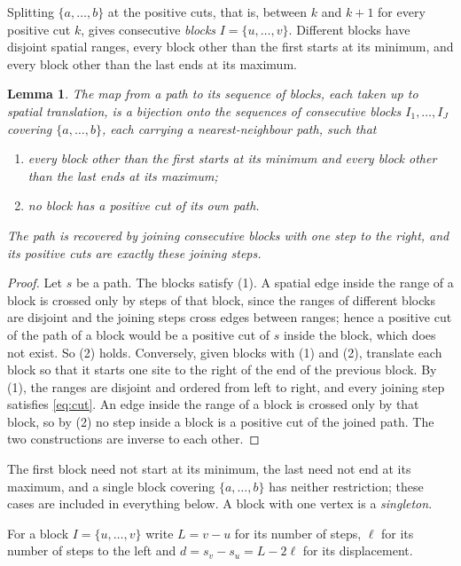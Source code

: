 \documentclass[11pt]{amsart}
\newtheorem{lemma}[theorem]{Lemma}
\theoremstyle{remark}
\begin{document}
Splitting $\{a,\dots,b\}$ at the positive cuts, that is, between $k$ and $k+1$ for every positive cut $k$, gives
consecutive \emph{blocks} $I=\{u,\dots,v\}$. Different blocks have disjoint spatial ranges, every block other than the
first starts at its minimum, and every block other than the last ends at its maximum.

\begin{lemma}\label{lem:blocks}
The map from a path to its sequence of blocks, each taken up to spatial translation, is a bijection onto the sequences
of consecutive blocks $I_1,\dots,I_J$ covering $\{a,\dots,b\}$, each carrying a nearest-neighbour path, such that
\begin{enumerate}
\item every block other than the first starts at its minimum and every block other than the last ends at its maximum;
\item no block has a positive cut of its own path.
\end{enumerate}
The path is recovered by joining consecutive blocks with one step to the right, and its positive cuts are exactly
these joining steps.
\end{lemma}

\begin{proof}
Let $s$ be a path. The blocks satisfy (1). A spatial edge inside the range of a block is crossed only by steps of that
block, since the ranges of different blocks are disjoint and the joining steps cross edges between ranges; hence a
positive cut of the path of a block would be a positive cut of $s$ inside the block, which does not exist. So (2)
holds. Conversely, given blocks with (1) and (2), translate each block so that it starts one site to the right of the
end of the previous block. By (1), the ranges are disjoint and ordered from left to right, and every joining step
satisfies \eqref{eq:cut}. An edge inside the range of a block is crossed only by that block, so by (2) no step inside
a block is a positive cut of the joined path. The two constructions are inverse to each other.
\end{proof}

The first block need not start at its minimum, the last need not end at its maximum, and a single block covering
$\{a,\dots,b\}$ has neither restriction; these cases are included in everything below. A block with one vertex is a
\emph{singleton}.

For a block $I=\{u,\dots,v\}$ write $L=v-u$ for its number of steps, $\ell$ for its number of steps to the left and
$d=s_v-s_u=L-2\ell$ for its displacement.
\end{document}
